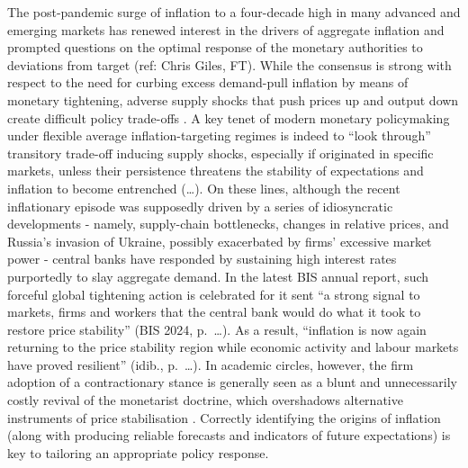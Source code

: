 \documentclass[
  letterpaper,
  DIV=11,
  numbers=noendperiod]{scrartcl}
\begin{document}
The post-pandemic surge of inflation to a four-decade high in many
advanced and emerging markets has renewed interest in the drivers of
aggregate inflation and prompted questions on the optimal response of
the monetary authorities to deviations from target (ref: Chris Giles,
FT). While the consensus is strong with respect to the need for curbing
excess demand-pull inflation by means of monetary tightening, adverse
supply shocks that push prices up and output down create difficult
policy trade-offs \citep{klomp2020}. A key tenet of modern monetary
policymaking under flexible average inflation-targeting regimes is
indeed to ``look through'' transitory trade-off inducing supply shocks,
especially if originated in specific markets, unless their persistence
threatens the stability of expectations and inflation to become
entrenched (\ldots). On these lines, although the recent inflationary
episode was supposedly driven by a series of idiosyncratic developments
- namely, supply-chain bottlenecks, changes in relative prices, and
Russia's invasion of Ukraine, possibly exacerbated by firms' excessive
market power \citep{stiglitz2023} - central banks have responded by
sustaining high interest rates purportedly to slay aggregate demand. In
the latest BIS annual report, such forceful global tightening action is
celebrated for it sent ``a strong signal to markets, firms and workers
that the central bank would do what it took to restore price stability''
(BIS 2024, p.~\ldots). As a result, ``inflation is now again returning
to the price stability region while economic activity and labour markets
have proved resilient'' (idib., p.~\ldots). In academic circles,
however, the firm adoption of a contractionary stance is generally seen
as a blunt and unnecessarily costly revival of the monetarist doctrine,
which overshadows alternative instruments of price stabilisation
\citep[see, for example,][]{stiglitz2023, weber2023}. Correctly
identifying the origins of inflation (along with producing reliable
forecasts and indicators of future expectations) is key to tailoring an
appropriate policy response.
\end{document}

